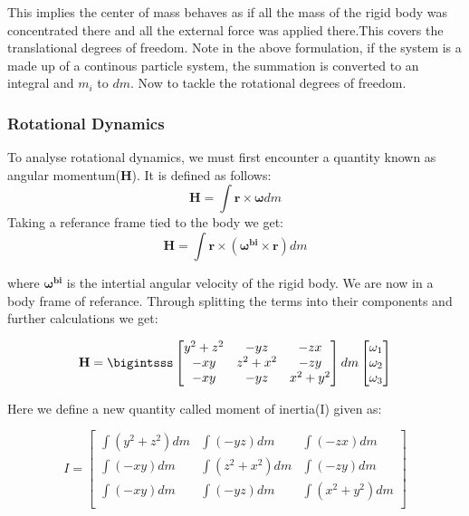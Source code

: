 \documentclass[12pt, letterpaper]{article}
\begin{document}
This implies the center of mass behaves as if all the mass of the rigid body was concentrated there and all the external force was applied there.This covers the translational degrees of freedom. Note in the above formulation, if the system is a made up of a continous particle system, the summation is converted to an integral and $m_i$ to $dm$. Now to tackle the rotational degrees of freedom.

\subsubsection{Rotational Dynamics}

To analyse rotational dynamics, we must first encounter a quantity known as angular momentum($\mathbf{H}$). It is defined as follows:
\begin{displaymath}
\mathbf{H} = \int \mathbf{r} \times \mathbf{\omega} dm 
\end{displaymath}
Taking a referance frame tied to the body we get:
\begin{displaymath}
\mathbf{H} = \int \mathbf{r} \times (\mathbf{\omega^{bi}} \times \mathbf{r}) dm 
\end{displaymath}

where $\mathbf{\omega^{bi}}$ is the intertial angular velocity of the rigid body. We are now in a body frame of referance. Through splitting the terms into their components and further calculations we get:

\begin{displaymath}
\mathbf{H} = \bigintsss
	\begin{bmatrix}
	y^2 + z^2 & -yz &  -zx\\
	 -xy &  z^2 + x^2 &  -zy\\
	 -xy & -yz & x^2 + y^2\\
	\end{bmatrix}
	dm
	\begin{bmatrix}
	\omega_1\\
	\omega_2\\
	\omega_3\\
	\end{bmatrix}
\end{displaymath}

Here we define a new quantity called moment of inertia(I) given as:

\begin{displaymath}
	I = 
	\begin{bmatrix}
	\int(y^2 + z^2)dm & \int(-yz)dm & \int(-zx)dm\\
	\int(-xy)dm & \int(z^2 + x^2)dm & \int(-zy)dm\\
	\int(-xy)dm & \int(-yz)dm & \int(x^2 + y^2)dm\\
	\end{bmatrix}
\end{displaymath}
\end{document}

